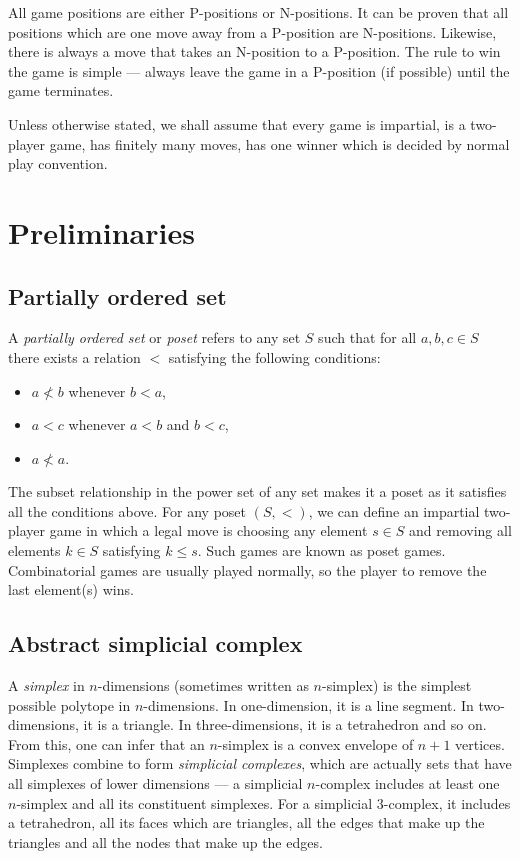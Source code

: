 \documentclass[a4paper, 12pt]{article}
\theoremstyle{remark} %
\begin{document}
\noindent All game positions are either P-positions or N-positions. It can be proven that all positions which are one move away from a P-position are N-positions. Likewise, there is always a move that takes an N-position to a P-position. The rule to win the game is simple --- always leave the game in a P-position (if possible) until the game terminates.

\noindent Unless otherwise stated, we shall assume that every game is impartial, is a two-player game, has finitely many moves, has one winner which is decided by normal play convention.

\section{Preliminaries}
\label{preliminaries}

\subsection{Partially ordered set}

A \textit{partially ordered set} or \textit{poset} refers to any set $S$ such that for all $a, b, c \in S$ there exists a relation $<$ satisfying the following conditions:
\begin{itemize}
	\item $a \nless b$ whenever $b < a$,
	\item $a < c$ whenever $a<b$ and $b<c$,
	\item $a \nless a$.
\end{itemize}

The subset relationship in the power set of any set makes it a poset as it satisfies all the conditions above. For any poset $(S,<)$, we can define an impartial two-player game in which a legal move is choosing any element $s \in S$ and removing all elements $k \in S$ satisfying $k \leq s$. Such games are known as poset games. Combinatorial games are usually played normally, so the player to remove the last element(s) wins.

\subsection{Abstract simplicial complex}

A \textit{simplex}  in $n$-dimensions (sometimes written as $n$-simplex) is the simplest possible polytope in $n$-dimensions. In one-dimension, it is a line segment. In two-dimensions, it is a triangle. In three-dimensions, it is a tetrahedron and so on. From this, one can infer that an $n$-simplex is a convex envelope of $n+1$ vertices. Simplexes combine to form \textit{simplicial complexes}, which are actually sets that have all simplexes of lower dimensions --- a simplicial $n$-complex includes at least one $n$-simplex and all its constituent simplexes. For a simplicial $3$-complex, it includes a tetrahedron, all its faces which are triangles, all the edges that make up the triangles and all the nodes that make up the edges.\\
\end{document}
